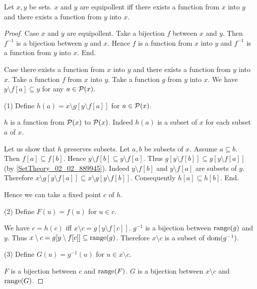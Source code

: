 \documentclass{article}
\begin{document}
  \begin{forthel}
    \begin{theorem}
      Let $x,y$ be sets.
      $x$ and $y$ are equipollent iff there exists a function from $x$ into $y$ and there exists a function from $y$ into $x$.
    \end{theorem}
    \begin{proof}
      Case $x$ and $y$ are equipollent.
        Take a bijection $f$ between $x$ and $y$.
        Then $f^{-1}$ is a bijection between $y$ and $x$.
        Hence $f$ is a function from $x$ into $y$ and $f^{-1}$ is a function from $y$ into $x$.
      End.

      Case there exists a function from $x$ into $y$ and there exists a function from $y$ into $x$.
        Take a function $f$ from $x$ into $y$.
        Take a function $g$ from $y$ into $x$.
        We have $y \setminus f[a] \subseteq y$ for any $a \in \mathcal{P}(x)$.

        (1) Define $h(a) = x \setminus g[y \setminus f[a]]$ for $a \in \mathcal{P}(x)$.

        $h$ is a function from $\mathcal{P}(x)$ to $\mathcal{P}(x)$.
        Indeed $h(a)$ is a subset of $x$ for each subset $a$ of $x$.

        Let us show that $h$ preserves subsets.
          Let $a,b$ be subsets of $x$.
          Assume $a \subseteq b$.
          Then $f[a] \subseteq f[b]$.
          Hence $y \setminus f[b] \subseteq y \setminus f[a]$.
          Thus $g[y \setminus f[b]] \subseteq g[y \setminus f[a]]$ (by \ref{SetTheory_02_02_889945}).
          Indeed $y \setminus f[b]$ and $y \setminus f[a]$ are subsets of $y$.
          Therefore $x \setminus g[y \setminus f[a]] \subseteq x \setminus g[y \setminus f[b]]$.
          Consequently $h[a] \subseteq h[b]$.
        End.

        Hence we can take a fixed point $c$ of $h$.

        (2) Define $F(u) = f(u)$ for $u \in c$.

        We have $c = h(c)$ iff $x \setminus c = g[y \setminus f[c]]$.
        $g^{-1}$ is a bijection between $\operatorname{range}(g)$ and $y$.
        Thus $x \setminus c = g[y \setminus f[c]] \subseteq \operatorname{range}(g)$.
        Therefore $x \setminus c$ is a subset of $\operatorname{dom}(g^{-1})$.

        (3) Define $G(u) = g^{-1}(u)$ for $u \in x \setminus c$.

        $F$ is a bijection between $c$ and $\operatorname{range}(F)$.
        $G$ is a bijection between $x \setminus c$ and $\operatorname{range}(G)$.


\end{proof}
\end{forthel}
\end{document}
